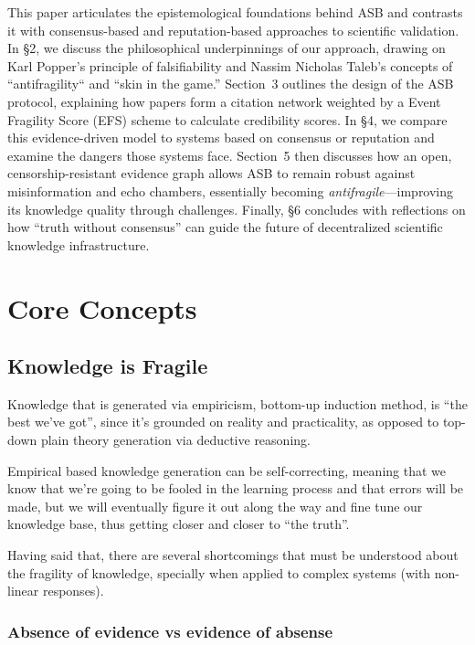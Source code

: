 \documentclass{article}
\begin{document}
This paper articulates the epistemological foundations behind ASB and contrasts it with consensus-based and reputation-based approaches to scientific validation. In \S2, we discuss the philosophical underpinnings of our approach, drawing on Karl Popper's principle of falsifiability and Nassim Nicholas Taleb's concepts of ``antifragility`` and ``skin in the game.'' Section~3 outlines the design of the ASB protocol, explaining how papers form a citation network weighted by a Event Fragility Score (EFS) scheme to calculate credibility scores. In \S4, we compare this evidence-driven model to systems based on consensus or reputation and examine the dangers those systems face. Section~5 then discusses how an open, censorship-resistant evidence graph allows ASB to remain robust against misinformation and echo chambers, essentially becoming \emph{antifragile}---improving its knowledge quality through challenges. Finally, \S6 concludes with reflections on how ``truth without consensus'' can guide the future of decentralized scientific knowledge infrastructure.

\section{Core Concepts}

\subsection{Knowledge is Fragile}

Knowledge that is generated via empiricism, bottom-up induction method, is ``the best we've got'', since it's grounded on reality and practicality, as opposed to top-down plain theory generation via deductive reasoning.

Empirical based knowledge generation can be self-correcting, meaning that we know that we're going to be fooled in the learning process and that errors will be made, but we will eventually figure it out along the way and fine tune our knowledge base, thus getting closer and closer to ``the truth''.

Having said that, there are several shortcomings that must be understood about the fragility of knowledge, specially when applied to complex systems (with non-linear responses).

\subsubsection{Absence of evidence vs evidence of absense}
\end{document}
